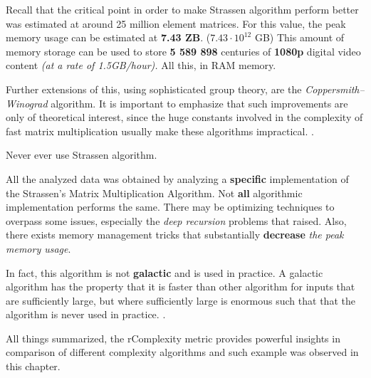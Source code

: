 Recall that the critical point in order to make Strassen algorithm perform better was estimated at around 25 million element matrices. For this value, the peak memory usage can be estimated at \textbf{7.43 ZB}. ($7.43 \cdot 10^{12}$ GB)
This amount of memory storage can be used to store \textbf{5 589 898} centuries of \textbf{1080p} digital video content \textit{(at a rate of 1.5GB/hour).} All this, in RAM memory.

Further extensions of this, using sophisticated group theory, are the \textit{Coppersmith–Winograd} algorithm. It is important to emphasize that such improvements are only of theoretical interest, since the huge constants involved in the complexity of fast matrix multiplication usually make these algorithms impractical. \cite{le2012faster}.

\begin{pitfall}
Never ever use Strassen algorithm.
\end{pitfall}
All the analyzed data was obtained by analyzing a \textbf{specific} implementation of the Strassen's Matrix Multiplication Algorithm. Not \textbf{all} algorithmic implementation performs the same. There may be optimizing techniques to overpass some issues, especially the \textit{deep recursion} problems that raised. Also, there exists memory management tricks that substantially \textbf{decrease} \textit{the peak memory usage}.

In fact, this algorithm is not \textbf{galactic} and is used in practice. A galactic algorithm has the property that it is faster than other algorithm for inputs that are sufficiently large, but where sufficiently large is enormous such that that the algorithm is never used in practice. \cite{le2012faster}.

All things summarized, the rComplexity metric provides powerful insights in comparison of different complexity algorithms and such example was observed in this chapter.


